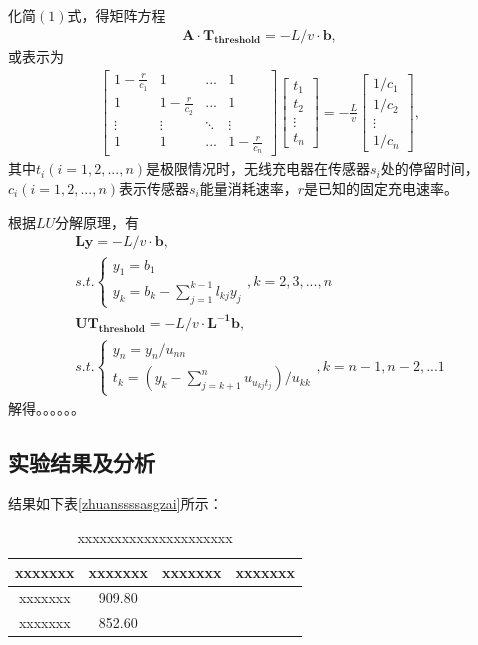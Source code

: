 \documentclass{whutmod}
\begin{document}
		化简$(1)$式，得矩阵方程
		\begin{gather}
		\bm A \cdot \bm{T_{threshold}}=-L/v \cdot \bm b,
		\end{gather}
		或表示为
		\begin{gather}
		\begin{bmatrix}
		1-\frac{r}{c_1} & 1 & ... & 1 \\ 
		1 & 1-\frac{r}{c_2} & ... & 1\\ 
		\vdots  & \vdots & \ddots  & \vdots \\ 
		1 & 1 & ... & 1-\frac{r}{c_n}
		\end{bmatrix}\begin{bmatrix}
		t_1\\ t_2\\ \vdots\\ t_n
		\end{bmatrix}=-\frac{L}{v}
		\begin{bmatrix}
		1/c_1\\ 1/c_2\\ \vdots\\ 1/c_n
		\end{bmatrix},
		\end{gather}
		其中$t_i(i=1,2,...,n)$是极限情况时，无线充电器在传感器$s_i$处的停留时间，$c_i(i=1,2,...,n)$表示传感器$s_i$能量消耗速率，$r$是已知的固定充电速率。
		
		根据$LU$分解原理，有
		\begin{gather}
		\bm{Ly}=-L/v\cdot \bm b,\\s.t.
		\left\{\begin{matrix}
		y_1=b_1
		\\ 
		y_k=b_k-\sum_{j=1}^{k-1}l_{kj}y_j
		\end{matrix}\right.,k=2,3,...,n\\
		\bm{UT_{threshold}}=-L/v \cdot \bm{L^{-1} b},\\s.t.
		\left\{\begin{matrix}
		y_n=y_n/u_{nn}
		\\ 
		t_k=(y_k-\sum_{j=k+1}^{n}u_{u_{kj}t_j})/u_{kk}
		\end{matrix}\right.,k=n-1,n-2,...1
		\end{gather}
		解得。。。。。。
        \subsection{实验结果及分析}
        
			结果如下表\ref{zhuanssssasgzai}所示：
			\begin{table}[H]
			\centering		
			\caption{xxxxxxxxxxxxxxxxxxxxx}\label{biao1}
			\begin{tabular}{cccc}
			\toprule[2pt]
				\multicolumn{1}{m{3.5cm}}{\centering xxxxxxx}
				& \multicolumn{1}{m{3.5cm}}{\centering xxxxxxx}& \multicolumn{1}{m{3.5cm}}{\centering xxxxxxx}& \multicolumn{1}{m{3.5cm}}{\centering xxxxxxx}
				\\
				\midrule[1pt]
				xxxxxxx &   909.80\\ 
				xxxxxxx & 	852.60\\ 
			\bottomrule[2pt]	
			\end{tabular}
			\end{table}
  
\end{document}
